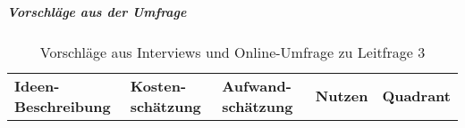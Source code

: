 \documentclass[../../main.tex]{subfiles}
\begin{document}
\subparagraph*{Vorschläge aus der Umfrage}\mbox{}


\sloppy 

\begin{table}[H]
\tablefontsize	
\centering
\caption{Vorschläge aus Interviews und Online-Umfrage zu Leitfrage 3}
\label{vorschlaege_leitfrage3}
\begin{tabular}{ |p{3.8cm}|p{2.5cm}|p{2.5cm}|p{3.8cm}|p{3.0cm}|}

\hline
\tableheaderbgcolor
\textbf{Ideen-Beschreibung} & \textbf{Kosten-\newline schätzung} & \textbf{Aufwand-\newline schätzung} & \textbf{Nutzen} & \textbf{Quadrant}\\ 


\end{tabular}
\end{table}
\end{document}
